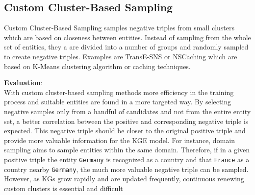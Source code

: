 \subsection{Custom Cluster-Based Sampling}
\label{subsec:custom_cluster_based_sampling}


Custom Cluster-Based Sampling samples negative triples from small clusters which are based on closeness between entities.
Instead of sampling from the whole set of entities, they a are divided into a number of groups and randomly sampled to create negative triples. 
Examples are TransE-\ac{SNS} \cite{TransE-SNS} or \ac{NSCaching} \cite{zhang2019nscaching} which are based on K-Means clustering algorithm or caching techniques. 



\textbf{Evaluation}:\\
With custom cluster-based sampling methods more efficiency in the training process and suitable entities are found in a more targeted way.
By selecting negative samples only from a handful of candidates and not from the entire entity set, a better correlation between the positive and corresponding negative triple is expected.
This negative triple should be closer to the original positive triple and provide more valuable information for the \ac{KGE} model.
For instance, domain sampling \cite{domainSampling} aims to sample entities within the same domain.
Therefore, if in a given positive triple  the entity \texttt{Germany} is recognized as a country and that \texttt{France} as a country nearby \texttt{Germany}, the much more valuable negative triple  can be sampled.
However, as \acp{KG} grow rapidly and are updated frequently, continuous renewing custom clusters is essential and difficult \cite{qianunderstanding}
